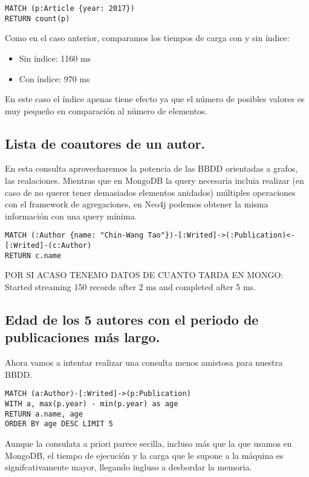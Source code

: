 \begin{verbatim}
MATCH (p:Article {year: 2017})
RETURN count(p)
\end{verbatim}

Como en el caso anterior, comparamos los tiempos de carga con y sin índice:

\begin{itemize}
 \item Sin índice: 1160 ms
 \item Con índice: 970 ms
\end{itemize}

En este caso el índice apenas tiene efecto ya que el número de posibles valores es muy pequeño en comparación al número de elementos.

\subsection{Lista de coautores de un autor.}

En esta consulta aprovecharemos la potencia de las \gls{BBDD} orientadas a grafos, las realaciones. Mientras que en MongoDB la query necesaria incluia realizar (en caso de no querer tener demasiados elementos anidados) múltiples operaciones con el framework de agregaciones, en Neo4j podemos obtener la misma información con una query mínima. 

\begin{verbatim}
MATCH (:Author {name: "Chin-Wang Tao"})-[:Writed]->(:Publication)<-[:Writed]-(c:Author)
RETURN c.name
\end{verbatim}

POR SI ACASO TENEMO DATOS DE CUANTO TARDA EN MONGO:
Started streaming 150 records after 2 ms and completed after 5 ms.

\subsection{Edad de los 5 autores con el periodo de publicaciones más largo.}

Ahora vamos a intentar realizar una consulta menos amistosa para nuestra \gls{BBDD}.

\begin{verbatim}
MATCH (a:Author)-[:Writed]->(p:Publication)
WITH a, max(p.year) - min(p.year) as age
RETURN a.name, age
ORDER BY age DESC LIMIT 5
\end{verbatim}

Aunque la consulata a priori parece secilla, incluso más que la que usamos en MongoDB, el tiempo de ejecución y la carga que le supone a la máquina es signifcativamente mayor, llegando ingluso a desbordar la memoria.

